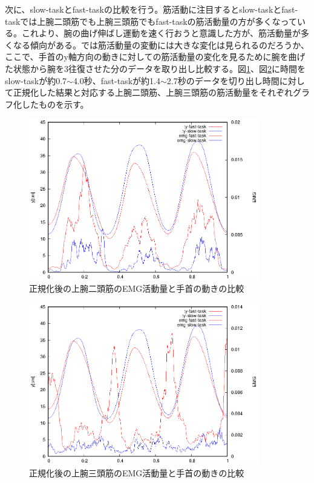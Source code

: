 \documentclass{jsarticle}
\begin{document}
\newpage
次に、slow-taskとfast-taskの比較を行う。筋活動に注目するとslow-taskとfast-taskでは上腕二頭筋でも上腕三頭筋でもfast-taskの筋活動量の方が多くなっている。これより、腕の曲げ伸ばし運動を速く行おうと意識した方が、筋活動量が多くなる傾向がある。では筋活動量の変動には大きな変化は見られるのだろうか、ここで、手首のy軸方向の動きに対しての筋活動量の変化を見るために腕を曲げた状態から腕を3往復させた分のデータを取り出し比較する。図\ref{hikaku3}、図\ref{hikaku4}に時間をslow-taskが約0.7$\sim$4.0秒、fast-taskが約1.4$\sim$2.7秒のデータを切り出し時間に対して正規化した結果と対応する上腕二頭筋、上腕三頭筋の筋活動量をそれぞれグラフ化したものを示す。
\begin{figure}[htb]
  \begin{center}
    \includegraphics[width=10cm]{hikakudata3.eps}
    \caption{正規化後の上腕二頭筋のEMG活動量と手首の動きの比較}
    \label{hikaku3}
  \end{center}
\end{figure}

\begin{figure}[htb]
  \begin{center}
    \includegraphics[width=10cm]{hikakudata4.eps}
    \caption{正規化後の上腕三頭筋のEMG活動量と手首の動きの比較}
    \label{hikaku4}
  \end{center}
\end{figure}
\end{document}
